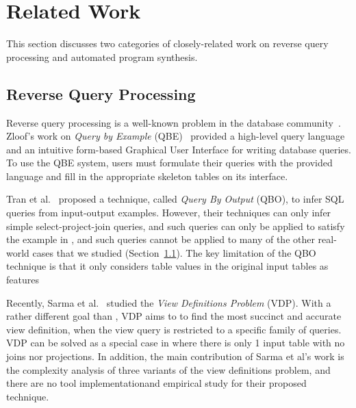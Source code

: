 
\section{Related Work}
\label{sec:related}

This section discusses two categories
of closely-related work on reverse query processing 
and automated program synthesis.


\subsection{Reverse Query Processing}

Reverse query processing is a well-known problem in the database
community~\cite{Zloof:1975, Tran:2009, DasSarma:2010}. Zloof's work on \textit{Query by Example} (QBE)~\cite{Zloof:1975}
provided a high-level query language and an intuitive
form-based Graphical User Interface for
writing database queries. To use the QBE system, 
users must formulate their queries with the
provided language and fill in the appropriate
skeleton tables on its interface.



Tran et al.~\cite{Tran:2009} proposed a technique, called \textit{Query By Output} (QBO), 
to infer SQL queries from input-output examples. 
However, their techniques can only infer simple select-project-join queries,
and such queries can only be applied to satisfy the example in ,
and such queries cannot be applied to many of the other real-world cases that we
studied (Section~\ref{}). The key limitation of the QBO technique is
that it only considers table values in the original input tables as
features 


Recently, Sarma et al.~\cite{DasSarma:2010} studied the \textit{View Definitions Problem} (VDP).
With a rather different goal than \ourtool,
VDP aims to to find the most
succinct and accurate view definition, when
the view query is restricted to a specific family of queries.
VDP can be solved as a special case in \ourtool where there is only 1
input table with no joins nor projections.
In addition, the main contribution of Sarma et al's work
is the complexity analysis of three variants of the view
definitions problem, and there are no tool implementationand empirical study
for their proposed technique.




